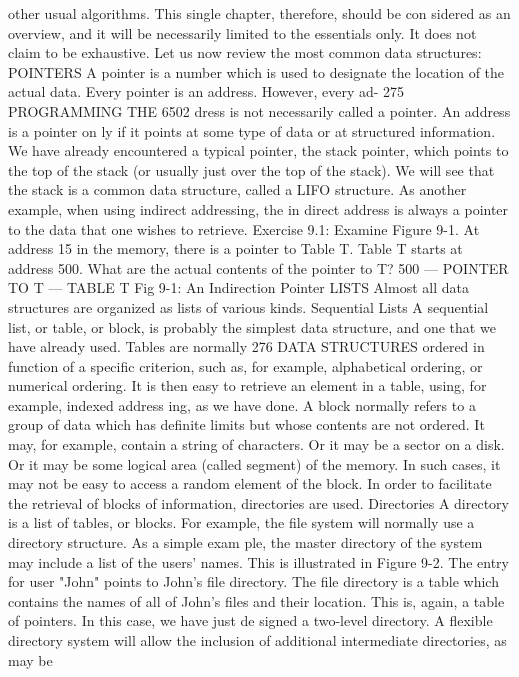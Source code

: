 \documentclass{book}
\begin{document}
{other usual algorithms. This single chapter, therefore, should be con
sidered as an overview, and it will be necessarily limited to the essentials
only. It does not claim to be exhaustive.
Let us now review the most common data structures:
POINTERS
A pointer is a number which is used to designate the location of
the actual data. Every pointer is an address. However, every ad-
275
PROGRAMMING THE 6502
dress is not necessarily called a pointer. An address is a pointer on
ly if it points at some type of data or at structured information. We
have already encountered a typical pointer, the stack pointer,
which points to the top of the stack (or usually just over the top of
the stack). We will see that the stack is a common data structure,
called a LIFO structure.
As another example, when using indirect addressing, the in
direct address is always a pointer to the data that one wishes to
retrieve.
Exercise 9.1: Examine Figure 9-1. At address 15 in the memory,
there is a pointer to Table T. Table T starts at address 500. What
are the actual contents of the pointer to T?
500
— POINTER TO T —
TABLE T
Fig 9-1: An Indirection Pointer
LISTS
Almost all data structures are organized as lists of various
kinds.
Sequential Lists
A sequential list, or table, or block, is probably the simplest data
structure, and one that we have already used. Tables are normally
276
DATA STRUCTURES
ordered in function of a specific criterion, such as, for example,
alphabetical ordering, or numerical ordering. It is then easy to
retrieve an element in a table, using, for example, indexed address
ing, as we have done. A block normally refers to a group of data
which has definite limits but whose contents are not ordered. It
may, for example, contain a string of characters. Or it may be a
sector on a disk. Or it may be some logical area (called segment) of
the memory. In such cases, it may not be easy to access a random
element of the block.
In order to facilitate the retrieval of blocks of information, directories
are used.
Directories
A directory is a list of tables, or blocks. For example, the file
system will normally use a directory structure. As a simple exam
ple, the master directory of the system may include a list of the
users' names. This is illustrated in Figure 9-2. The entry for user
"John" points to John's file directory. The file directory is a table
which contains the names of all of John's files and their location.
This is, again, a table of pointers. In this case, we have just de
signed a two-level directory. A flexible directory system will allow
the inclusion of additional intermediate directories, as may be
}
\end{document}
